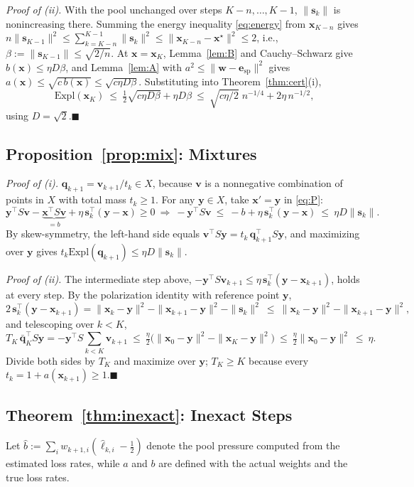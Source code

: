 \documentclass{article} %
\theoremstyle{plain}
\theoremstyle{remark}
\newcommand{\Expl}{\mathrm{Expl}}
\newcommand{\bx}{{\bm{x}}}
\newcommand{\by}{{\bm{y}}}
\newcommand{\bv}{{\bm{v}}}
\newcommand{\bw}{{\bm{w}}}
\newcommand{\bq}{{\bm{q}}}
\newcommand{\be}{{\bm{e}}}
\newcommand{\xs}{\bx^{\star}}
\newcommand{\dx}{{\bm{s}}}
\newcommand{\esp}{\be_{\mathrm{sp}}}
\begin{document}
\textit{Proof of (ii).} With the pool unchanged over steps $K-n,\dots,K-1$, $\|\dx_k\|$ is nonincreasing there. Summing the energy inequality \eqref{eq:energy} from $\bx_{K-n}$ gives $n\|\dx_{K-1}\|^2\le\sum_{k=K-n}^{K-1}\|\dx_k\|^2\le\|\bx_{K-n}-\xs\|^2\le2$, i.e., $\beta:=\|\dx_{K-1}\|\le\sqrt{2/n}$. At $\bx=\bx_K$, Lemma~\ref{lem:B} and Cauchy--Schwarz give $b(\bx)\le\eta D\beta$, and Lemma~\ref{lem:A} with $a^2\le\|\bw-\esp\|^2$ gives $a(\bx)\le\sqrt{c\,b(\bx)}\le\sqrt{c\eta D\beta}$. Substituting into Theorem~\ref{thm:cert}(i),
\[
\Expl(\bx_K)\ \le\ \tfrac12\sqrt{c\eta D\beta}+\eta D\beta\ \le\ \sqrt{c\eta/2}\;n^{-1/4}+2\eta\,n^{-1/2},
\]
using $D=\sqrt2$.\hfill$\blacksquare$

\subsection{Proposition~\ref{prop:mix}: Mixtures}
\label{app:mix}

\textit{Proof of (i).} $\bq_{k+1}=\bv_{k+1}/t_k\in X$, because $\bv$ is a nonnegative combination of points in $X$ with total mass $t_k\ge1$. For any $\by\in X$, take $\bx'=\by$ in \eqref{eq:P}:
\[
\by^\top S\bv-\underbrace{\bx^\top S\bv}_{=b}+\eta\,\dx_k^\top(\by-\bx)\ge0
\ \Longrightarrow\
-\by^\top S\bv\ \le\ -b+\eta\,\dx_k^\top(\by-\bx)\ \le\ \eta D\|\dx_k\| .
\]
By skew-symmetry, the left-hand side equals $\bv^\top S\by=t_k\,\bq_{k+1}^\top S\by$, and maximizing over $\by$ gives $t_k\Expl(\bq_{k+1})\le\eta D\|\dx_k\|$.

\textit{Proof of (ii).} The intermediate step above, $-\by^\top S\bv_{k+1}\le\eta\,\dx_k^\top(\by-\bx_{k+1})$, holds at every step. By the polarization identity with reference point $\by$,
\[
2\,\dx_k^\top(\by-\bx_{k+1})=\|\bx_k-\by\|^2-\|\bx_{k+1}-\by\|^2-\|\dx_k\|^2\ \le\ \|\bx_k-\by\|^2-\|\bx_{k+1}-\by\|^2 ,
\]
and telescoping over $k<K$,
\[
T_K\,\bar{\bq}_K^\top S\by=-\by^\top S\sum_{k<K}\bv_{k+1}\ \le\ \tfrac\eta2\big(\|\bx_0-\by\|^2-\|\bx_K-\by\|^2\big)\ \le\ \tfrac\eta2\|\bx_0-\by\|^2\ \le\ \eta .
\]
Divide both sides by $T_K$ and maximize over $\by$; $T_K\ge K$ because every $t_k=1+a(\bx_{k+1})\ge1$.\hfill$\blacksquare$

\subsection{Theorem~\ref{thm:inexact}: Inexact Steps}
\label{app:inexact}

Let $\hat b:=\sum_iw_{k+1,i}(\hat\ell_{k,i}-\tfrac12)$ denote the pool pressure computed from the estimated loss rates, while $a$ and $b$ are defined with the actual weights and the true loss rates.
\end{document}
